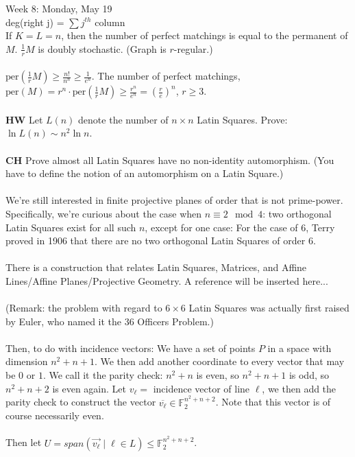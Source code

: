 \documentclass[12pt]{article}
\theoremstyle{remark}
\newcommand{\F}{\mathbb{F}}
\newcommand*\w[1]{\overrightarrow{#1}}
\newcommand{\per}{\mathrm{per}}
\begin{document}
\begin{section}{Week 8: Monday, May 19}
\\
deg(right j) = $\sum j^{th}$ column
\\
If $K = L = n$, then the number of perfect matchings is equal to the permanent of $M$. $\frac 1 r M$ is doubly stochastic. (Graph is $r$-regular.)
\\\\
$\per(\frac 1 r M) \geq \frac {n!}{n^n} \geq \frac 1 {e^n}$. The number of perfect matchings, $\per(M) = r^n \cdot \per(\frac 1 r M) \geq \frac{r^n}{e^n} = (\frac r e)^n$, $r \geq 3$.
\\\\
\textbf{HW} Let $L(n)$ denote the number of $n \times n$ Latin Squares. Prove: $\ln L(n) \sim n^2 \ln n$.
\\\\
\textbf{CH} Prove almost all Latin Squares have no non-identity automorphism. (You have to define the notion of an automorphism on a Latin Square.)
\\\\
We're still interested in finite projective planes of order that is not prime-power. Specifically, we're curious about the case when $n \equiv 2 \mod 4$: two orthogonal Latin Squares exist for all such $n$, except for one case: For the case of $6$, Terry proved in 1906 that there are no two orthogonal Latin Squares of order $6$.\\\\
There is a construction that relates Latin Squares, Matrices, and Affine Lines/Affine Planes/Projective Geometry. A reference will be inserted here...
\\\\
(Remark: the problem with regard to $6 \times 6$ Latin Squares was actually first raised by Euler, who named it the 36 Officers Problem.)
\\\\
Then, to do with incidence vectors: We have a set of points $P$ in a space with dimension $n^2 + n +1$. We then add another coordinate to every vector that may be $0$ or $1$. We call it the parity check: $n^2 + n$ is even, so $n^2 + n + 1$ is odd, so $n^2 + n + 2$ is even again. Let $v_\ell =$ incidence vector of line $\ell$, we then add the parity check to construct the vector $\overline{v_\ell} \in \F_2^{n^2+n+2}$. Note that this vector is of course necessarily even. 
\\\\
Then let $U = span(\w{v_\ell} \mid \ell \in L ) \leq \F_2^{n^2+n+2}$.
\\\\

\end{section}
\end{document}
